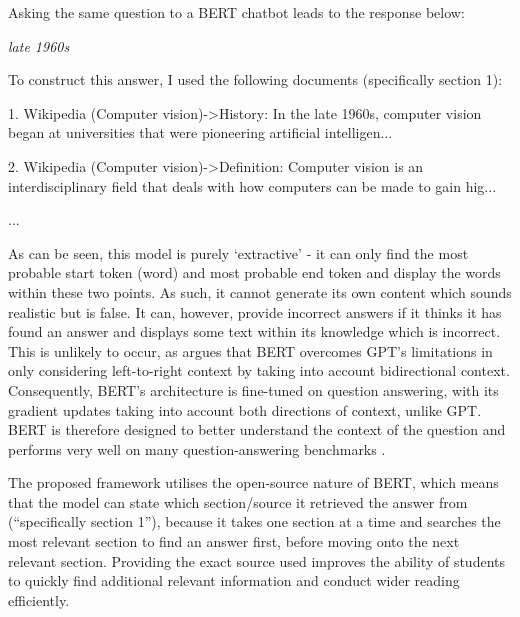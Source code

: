 \documentclass{article}
\newenvironment{itquote}
  {\begin{displayquote}\itshape}
  {\end{displayquote}\ignorespacesafterend}
\begin{document}
    

Asking the same question to a BERT chatbot leads to the response below:

\begin{itquote}
    late 1960s
    
    To construct this answer, I used the following documents (specifically section 1): 
    
    1. Wikipedia (Computer vision)->History:
    In the late 1960s, computer vision began at universities that were pioneering artificial intelligen...
    
    2. Wikipedia (Computer vision)->Definition:
    Computer vision is an interdisciplinary field that deals with how computers can be made to gain hig...

    ...
\end{itquote}

As can be seen, this model is purely `extractive' - it can only find the most probable start token (word) and most probable end token and display the words within these two points. As such, it cannot generate its own content which sounds realistic but is false. It can, however, provide incorrect answers if it thinks it has found an answer and displays some text within its knowledge which is incorrect. This is unlikely to occur, as \citet{devlin2019bert} argues that BERT overcomes GPT's limitations in only considering left-to-right context by taking into account bidirectional context. Consequently, BERT's architecture is fine-tuned on question answering, with its gradient updates taking into account both directions of context, unlike GPT. BERT is therefore designed to better understand the context of the question and performs very well on many question-answering benchmarks \citep{devlin2019bert}. 

The proposed framework utilises the open-source nature of BERT, which means that the model can state which section/source it retrieved the answer from (``specifically section 1''), because it takes one section at a time and searches the most relevant section to find an answer first, before moving onto the next relevant section. Providing the exact source used improves the ability of students to quickly find additional relevant information and conduct wider reading efficiently. 
\end{document}
